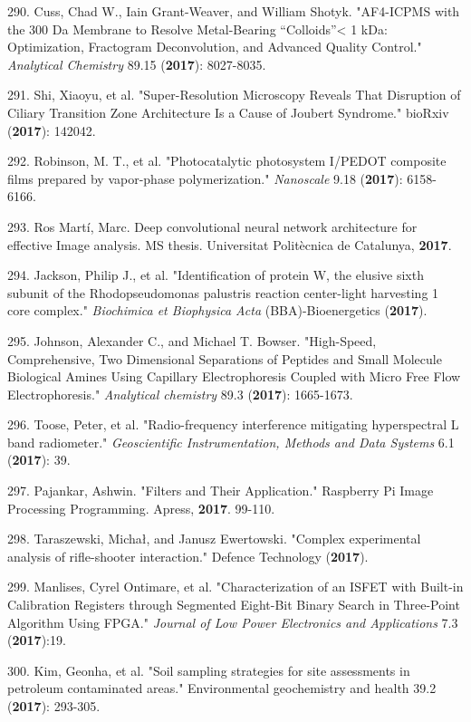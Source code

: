 290. Cuss, Chad W., Iain Grant-Weaver, and William Shotyk. "AF4-ICPMS with the 300 Da Membrane to Resolve Metal-Bearing ``Colloids''{\textless} 1 kDa: Optimization, Fractogram Deconvolution, and Advanced Quality Control." \textit{Analytical Chemistry} 89.15 (\textbf{2017}): 8027-8035.

291. Shi, Xiaoyu, et al. "Super-Resolution Microscopy Reveals That Disruption of Ciliary Transition Zone Architecture Is a Cause of Joubert Syndrome." bioRxiv (\textbf{2017}): 142042.

292. Robinson, M. T., et al. "Photocatalytic photosystem I/PEDOT composite films prepared by vapor-phase polymerization." \textit{Nanoscale} 9.18 (\textbf{2017}): 6158-6166.

293. Ros Mart\'{i}, Marc. Deep convolutional neural network architecture for effective Image analysis. MS thesis. Universitat Polit\`{e}cnica de Catalunya, \textbf{2017}.

294. Jackson, Philip J., et al. "Identification of protein W, the elusive sixth subunit of the Rhodopseudomonas palustris reaction center-light harvesting 1 core complex." \textit{Biochimica et Biophysica Acta} (BBA)-Bioenergetics (\textbf{2017}).

295. Johnson, Alexander C., and Michael T. Bowser. "High-Speed, Comprehensive, Two Dimensional Separations of Peptides and Small Molecule Biological Amines Using Capillary Electrophoresis Coupled with Micro Free Flow Electrophoresis." \textit{Analytical chemistry} 89.3 (\textbf{2017}): 1665-1673.

296. Toose, Peter, et al. "Radio-frequency interference mitigating hyperspectral L band radiometer." \textit{Geoscientific Instrumentation, Methods and Data Systems} 6.1 (\textbf{2017}): 39.

297. Pajankar, Ashwin. "Filters and Their Application." Raspberry Pi Image Processing Programming. Apress, \textbf{2017}. 99-110.

298. Taraszewski, Micha\l{}, and Janusz Ewertowski. "Complex experimental analysis of rifle-shooter interaction." Defence Technology (\textbf{2017}).

299. Manlises, Cyrel Ontimare, et al. "Characterization of an ISFET with Built-in Calibration Registers through Segmented Eight-Bit Binary Search in Three-Point Algorithm Using FPGA." \textit{Journal of Low Power Electronics and Applications} 7.3 (\textbf{2017}):19.

300. Kim, Geonha, et al. "Soil sampling strategies for site assessments in petroleum contaminated areas." Environmental geochemistry and health 39.2 (\textbf{2017}): 293-305.

